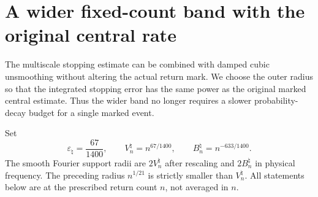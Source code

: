 \section{A wider fixed-count band with the original central rate}
\label{sec:rate-preserving-band}
The multiscale stopping estimate can be combined with damped cubic
unsmoothing without altering the actual return mark. We choose the
outer radius so that the integrated stopping error has the same power
as the original marked central estimate. Thus the wider band no longer
requires a slower probability-decay budget for a single marked event.

Set
\begin{equation}\label{eq:rate-preserving-scales}
 \varepsilon_\natural=\frac{67}{1400},\qquad
 V_n^\natural=n^{67/1400},\qquad
 B_n^\natural=n^{-633/1400}.
\end{equation}
The smooth Fourier support radii are $2V_n^\natural$ after rescaling
and $2B_n^\natural$ in physical frequency. The preceding radius
$n^{1/21}$ is strictly smaller than $V_n^\natural$. All statements
below are at the prescribed return count $n$, not averaged in $n$.

